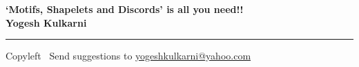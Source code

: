 
\graphicspath{{images/}}

\footnotesize


\begin{center}
\Large{\textbf{`Motifs, Shapelets and Discords' is all you need!!\\ Yogesh Kulkarni}}  
\end{center}

\begin{multicols}{2}

\end{multicols}

\rule{\linewidth}{0.25pt}
\scriptsize
Copyleft \textcopyleft\  Send suggestions to 
\href{http://www.yogeshkulkarni.com}{yogeshkulkarni@yahoo.com}


